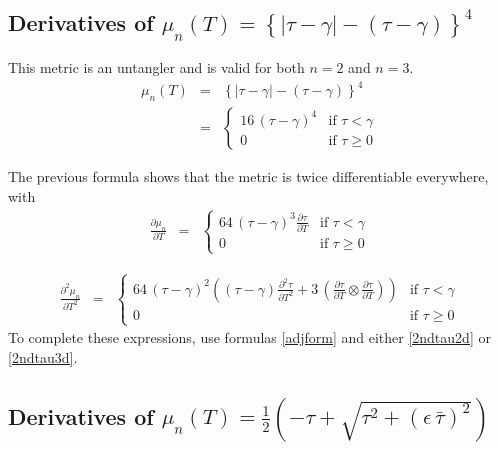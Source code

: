\documentclass{report}
\begin{document}
\subsection{Derivatives of $\mu_n(T) = \left\{ |\tau-\gamma| - \left( \tau-\gamma \right) \right\}^4$}

\noindent This metric is an untangler and is valid for both $n=2$ and $n=3$. 
\begin{eqnarray}
\mu_n(T) & = & \left\{ |\tau-\gamma| - \left( \tau-\gamma \right) \right\}^4 \\
         & = & \left\{ \begin{array}{cc} 
 16 \, (\tau-\gamma)^4 & \mbox{if $\tau<\gamma$} \\
0                      & \mbox{if $\tau \geq 0$}
\end{array} \right.
\end{eqnarray}

\noindent The previous formula shows that the metric is twice differentiable everywhere, with
\begin{eqnarray}
\frac{\partial \mu_n}{\partial T} & = & \left\{ \begin{array}{cc} 
64 \, (\tau-\gamma)^3 \frac{\partial \tau}{\partial T} & \mbox{if $\tau<\gamma$} \\
0                      & \mbox{if $\tau \geq 0$}
\end{array} \right.
\end{eqnarray}

\begin{eqnarray}
\frac{\partial^2 \mu_n}{\partial T^2} & = & \left\{ \begin{array}{cc} 
64 \, (\tau-\gamma)^2 \left( (\tau-\gamma) \frac{\partial^2 \tau}{\partial T^2} + 3 \, \left( \frac{\partial \tau}{\partial T} \otimes \frac{\partial \tau}{\partial T} \right) \right) & \mbox{if $\tau<\gamma$} \\
0                      & \mbox{if $\tau \geq 0$}
\end{array} \right.
\end{eqnarray}
To complete these expressions, use formulas \ref{adjform} and either 
\ref{2ndtau2d} or \ref{2ndtau3d}. \newline

\subsection{Derivatives of $\mu_n(T) = \frac{1}{2} \left( - \tau + \sqrt{\tau^2 + \left(\epsilon \, \bar{\tau} \right)^2} \right)$}
\end{document}
